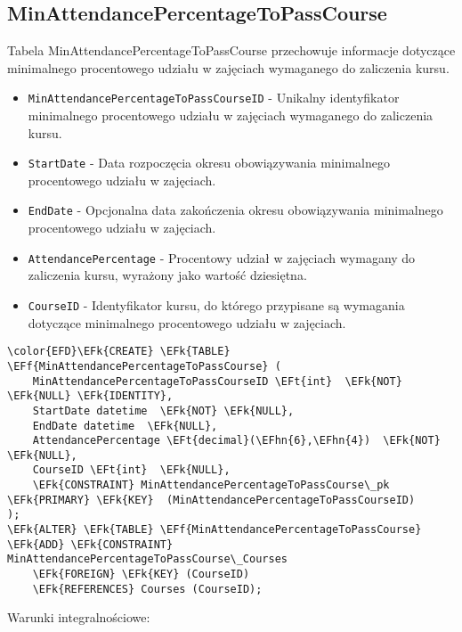 \documentclass[11pt]{article}
\newcommand{\EFk}[1]{\textcolor{EFk}{\textbf{#1}}} %
\newcommand{\EFf}[1]{\textcolor{EFf}{#1}} %
\newcommand{\EFt}[1]{\textcolor{EFt}{\textbf{#1}}} %
\newcommand{\EFhn}[1]{\textcolor{EFhn}{#1}} %
\begin{document}
\subsection{MinAttendancePercentageToPassCourse}
\label{sec:org4d14afb}
Tabela MinAttendancePercentageToPassCourse przechowuje informacje dotyczące minimalnego procentowego udziału w zajęciach wymaganego do zaliczenia kursu.
\begin{itemize}
\item \texttt{MinAttendancePercentageToPassCourseID} - Unikalny identyfikator minimalnego procentowego udziału w zajęciach wymaganego do zaliczenia kursu.
\item \texttt{StartDate} - Data rozpoczęcia okresu obowiązywania minimalnego procentowego udziału w zajęciach.
\item \texttt{EndDate} - Opcjonalna data zakończenia okresu obowiązywania minimalnego procentowego udziału w zajęciach.
\item \texttt{AttendancePercentage} - Procentowy udział w zajęciach wymagany do zaliczenia kursu, wyrażony jako wartość dziesiętna.
\item \texttt{CourseID} - Identyfikator kursu, do którego przypisane są wymagania dotyczące minimalnego procentowego udziału w zajęciach.
\end{itemize}
\begin{Code}
\begin{Verbatim}
\color{EFD}\EFk{CREATE} \EFk{TABLE} \EFf{MinAttendancePercentageToPassCourse} (
    MinAttendancePercentageToPassCourseID \EFt{int}  \EFk{NOT} \EFk{NULL} \EFk{IDENTITY},
    StartDate datetime  \EFk{NOT} \EFk{NULL},
    EndDate datetime  \EFk{NULL},
    AttendancePercentage \EFt{decimal}(\EFhn{6},\EFhn{4})  \EFk{NOT} \EFk{NULL},
    CourseID \EFt{int}  \EFk{NULL},
    \EFk{CONSTRAINT} MinAttendancePercentageToPassCourse\_pk \EFk{PRIMARY} \EFk{KEY}  (MinAttendancePercentageToPassCourseID)
);
\EFk{ALTER} \EFk{TABLE} \EFf{MinAttendancePercentageToPassCourse} \EFk{ADD} \EFk{CONSTRAINT} MinAttendancePercentageToPassCourse\_Courses
    \EFk{FOREIGN} \EFk{KEY} (CourseID)
    \EFk{REFERENCES} Courses (CourseID);
\end{Verbatim}
\end{Code}
Warunki integralnościowe:
\end{document}
